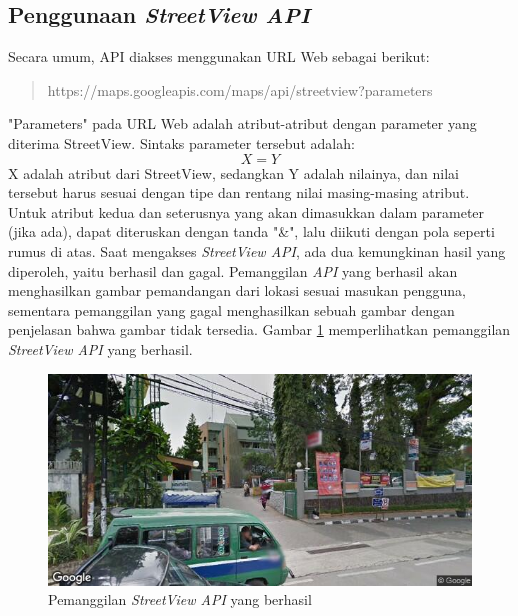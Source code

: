 \subsection{Penggunaan {\it StreetView API}}
\label{subs:streetview-usage}
Secara umum, API diakses menggunakan URL Web sebagai berikut:
\begin{quote}
https://maps.googleapis.com/maps/api/streetview?parameters
\end{quote}
"Parameters" pada URL Web adalah atribut-atribut dengan parameter yang diterima StreetView. Sintaks parameter tersebut adalah: $$ X = Y $$
X adalah atribut dari StreetView, sedangkan Y adalah nilainya, dan nilai tersebut harus sesuai dengan tipe dan rentang nilai masing-masing atribut. Untuk atribut kedua dan seterusnya yang akan dimasukkan dalam parameter (jika ada), dapat diteruskan dengan tanda "\&", lalu diikuti dengan pola seperti rumus di atas. Saat mengakses {\it StreetView API}, ada dua kemungkinan hasil yang diperoleh, yaitu berhasil dan gagal. Pemanggilan \textit{API} yang berhasil akan menghasilkan gambar pemandangan dari lokasi sesuai masukan pengguna, sementara pemanggilan yang gagal menghasilkan sebuah gambar dengan penjelasan bahwa gambar tidak tersedia. Gambar \ref{fig:success-streetview} memperlihatkan pemanggilan \textit{StreetView API} yang berhasil.
\begin{figure}[h]
		\includegraphics[scale=0.8]{Gambar/streetview.png}
	\caption{Pemanggilan \textit{StreetView API} yang berhasil}
	\label{fig:success-streetview}
\end{figure}


